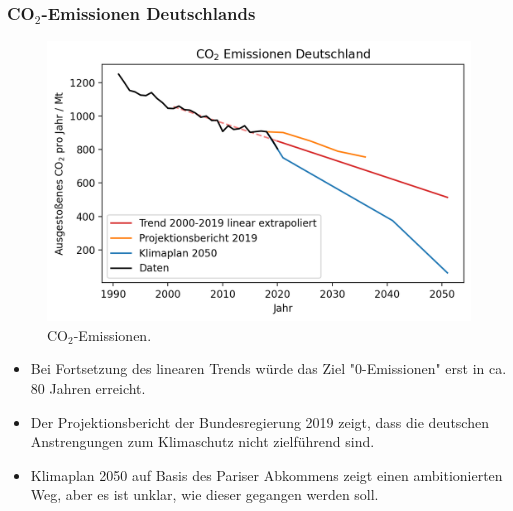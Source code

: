 \begin{frame}
    \frametitle{CO$_2$-Emissionen Deutschlands}
	\begin{figure}
		\centering
		\includegraphics[height=.55\textheight]{bilder/co2-emissions-de.png}
		\caption{CO$_2$-Emissionen.}
    \end{figure}
    \begin{itemize}
        \item Bei Fortsetzung des linearen Trends würde das Ziel "0-Emissionen" erst in ca. 80 Jahren erreicht.
        \item Der Projektionsbericht der Bundesregierung 2019 zeigt, dass die deutschen Anstrengungen zum Klimaschutz nicht zielführend sind.
        \item Klimaplan 2050 auf Basis des Pariser Abkommens zeigt einen ambitionierten Weg, aber es ist unklar, wie dieser gegangen werden soll.
    \end{itemize}
\end{frame}

